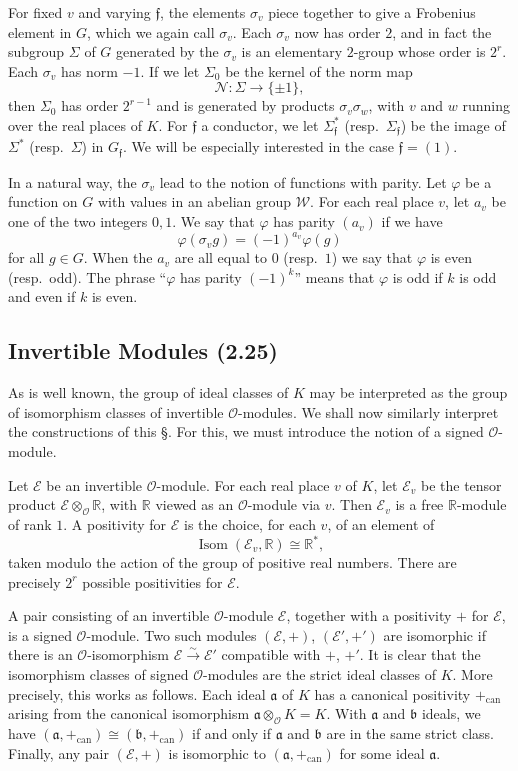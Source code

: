 \documentclass[12pt,a4paper]{article}
\theoremstyle{plain}
\theoremstyle{definition}
\DeclareMathOperator{\Isom}{Isom}
\newcommand{\OO}{\mathcal{O}}
\newcommand{\ff}{\mathfrak{f}}
\newcommand{\R}{\mathbb{R}}
\newcommand{\can}{\mathrm{can}}
\begin{document}
For fixed $v$ and varying $\ff$, the elements $\sigma_v$ piece together to give a Frobenius element in $G$, which we again call $\sigma_v$. Each $\sigma_v$ now has order $2$, and in fact the subgroup $\Sigma$ of $G$ generated by the $\sigma_v$ is an elementary $2$-group whose order is $2^r$. Each $\sigma_v$ has norm $-1$. If we let $\Sigma_0$ be the kernel of the norm map
\[
\mathcal{N}:\Sigma\to\{\pm1\},
\]
then $\Sigma_0$ has order $2^{r-1}$ and is generated by products $\sigma_v\sigma_w$, with $v$ and $w$ running over the real places of $K$. For $\ff$ a conductor, we let $\Sigma_{\ff}^*$ (resp.~$\Sigma_{\ff}$) be the image of $\Sigma^*$ (resp.~$\Sigma$) in $G_{\ff}$. We will be especially interested in the case $\ff=(1)$.

In a natural way, the $\sigma_v$ lead to the notion of functions with parity. Let $\varphi$ be a function on $G$ with values in an abelian group $\mathcal{W}$. For each real place $v$, let $a_v$ be one of the two integers $0,1$. We say that $\varphi$ has parity $(a_v)$ if we have
\[
\varphi(\sigma_vg)=(-1)^{a_v}\varphi(g)
\]
for all $g\in G$. When the $a_v$ are all equal to $0$ (resp.~$1$) we say that $\varphi$ is even (resp.~odd). The phrase ``$\varphi$ has parity $(-1)^k$'' means that $\varphi$ is odd if $k$ is odd and even if $k$ is even.

\subsection*{Invertible Modules (2.25)}

As is well known, the group of ideal classes of $K$ may be interpreted as the group of isomorphism classes of invertible $\OO$-modules. We shall now similarly interpret the constructions of this \S. For this, we must introduce the notion of a signed $\OO$-module.

Let $\mathscr{E}$ be an invertible $\OO$-module. For each real place $v$ of $K$, let $\mathscr{E}_v$ be the tensor product $\mathscr{E}\otimes_{\OO}\R$, with $\R$ viewed as an $\OO$-module via $v$. Then $\mathscr{E}_v$ is a free $\R$-module of rank $1$. A positivity for $\mathscr{E}$ is the choice, for each $v$, of an element of
\[
\Isom(\mathscr{E}_v,\R)\cong\R^*,
\]
taken modulo the action of the group of positive real numbers. There are precisely $2^r$ possible positivities for $\mathscr{E}$.

A pair consisting of an invertible $\OO$-module $\mathscr{E}$, together with a positivity $+$ for $\mathscr{E}$, is a signed $\OO$-module. Two such modules $(\mathscr{E},+)$, $(\mathscr{E}',+')$ are isomorphic if there is an $\OO$-isomorphism $\mathscr{E}\xrightarrow{\sim}\mathscr{E}'$ compatible with $+$, $+'$. It is clear that the isomorphism classes of signed $\OO$-modules are the strict ideal classes of $K$. More precisely, this works as follows. Each ideal $\mathfrak{a}$ of $K$ has a canonical positivity $+_{\can}$ arising from the canonical isomorphism $\mathfrak{a}\otimes_{\OO}K=K$. With $\mathfrak{a}$ and $\mathfrak{b}$ ideals, we have $(\mathfrak{a},+_{\can})\cong(\mathfrak{b},+_{\can})$ if and only if $\mathfrak{a}$ and $\mathfrak{b}$ are in the same strict class. Finally, any pair $(\mathscr{E},+)$ is isomorphic to $(\mathfrak{a},+_{\can})$ for some ideal $\mathfrak{a}$.
\end{document}
